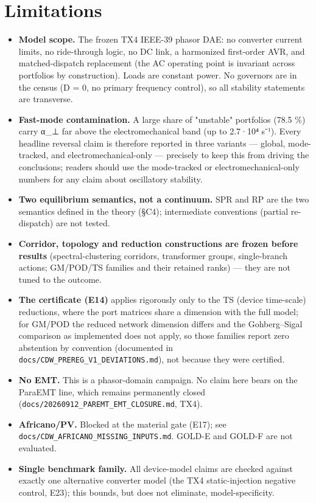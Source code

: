 \documentclass[10pt,a4paper]{article}
\begin{document}
\section{Limitations}
\begin{itemize}
\item \textbf{Model scope.} The frozen TX4 IEEE-39 phasor DAE: no converter current limits, no ride-through logic, no DC link, a harmonized first-order AVR, and matched-dispatch replacement (the AC operating point is invariant across portfolios by construction). Loads are constant power. No governors are in the census (D = 0, no primary frequency control), so all stability statements are transverse.
\item \textbf{Fast-mode contamination.} A large share of "unstable" portfolios (78.5 \%) carry α\_⊥ far above the electromechanical band (up to 2.7·10⁴ s⁻¹). Every headline reversal claim is therefore reported in three variants — global, mode-tracked, and electromechanical-only — precisely to keep this from driving the conclusions; readers should use the mode-tracked or electromechanical-only numbers for any claim about oscillatory stability.
\item \textbf{Two equilibrium semantics, not a continuum.} SPR and RP are the two semantics defined in the theory (§C4); intermediate conventions (partial re-dispatch) are not tested.
\item \textbf{Corridor, topology and reduction constructions are frozen before results} (spectral-clustering corridors, transformer groups, single-branch actions; GM/POD/TS families and their retained ranks) — they are not tuned to the outcome.
\item \textbf{The certificate (E14)} applies rigorously only to the TS (device time-scale) reductions, where the port matrices share a dimension with the full model; for GM/POD the reduced network dimension differs and the Gohberg–Sigal comparison as implemented does not apply, so those families report zero abstention by convention (documented in \texttt{docs/\allowbreak{}CDW\_\allowbreak{}PREREG\_\allowbreak{}V1\_\allowbreak{}DEVIATIONS.md}), not because they were certified.
\item \textbf{No EMT.} This is a phasor-domain campaign. No claim here bears on the ParaEMT line, which remains permanently closed (\texttt{docs/\allowbreak{}20260912\_\allowbreak{}PAREMT\_\allowbreak{}EMT\_\allowbreak{}CLOSURE.md}, TX4).
\item \textbf{Africano/PV.} Blocked at the material gate (E17); see \texttt{docs/\allowbreak{}CDW\_\allowbreak{}AFRICANO\_\allowbreak{}MISSING\_\allowbreak{}INPUTS.md}. GOLD-E and GOLD-F are not evaluated.
\item \textbf{Single benchmark family.} All device-model claims are checked against exactly one alternative converter model (the TX4 static-injection negative control, E23); this bounds, but does not eliminate, model-specificity.
\end{itemize}
\end{document}
